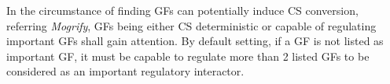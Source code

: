 \documentclass[fleqn,10pt]{wlscirep}
\begin{document}
In the circumstance of finding GFs can potentially induce CS conversion, referring \emph{Mogrify}\cite{mogrify_2016}, GFs being either CS deterministic or capable of regulating important GFs shall gain attention.
By default setting, if a GF is not listed as important GF, it must be capable to regulate more than 2 listed GFs to be considered as an important regulatory interactor.

%
\end{document}
